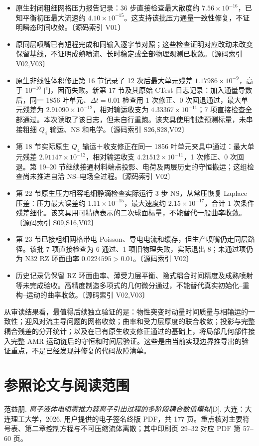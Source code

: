 \documentclass[UTF8,a4paper,11pt,fontset=fandol]{ctexart}
\newcommand{\src}[1]{\textcolor{ink}{\small〔源码索引 #1〕}}
\newcommand{\dt}{\Delta t}
\begin{document}
\begin{itemize}
\item 原生封闭粗细网格压力报告记录：36 步直接检查最大散度约 $7.56\times10^{-16}$，已知平衡初压最大流速约 $4.10\times10^{-15}$。这支持该批压力通量一致性修复，不证明瞬态时间收敛。\src{V01}
\item 原同层喷嘴已有短程完成和同输入逐字节对照；这些检查证明对应改动未改变保留基线，不证明成熟喷流、长时稳定或全部物理观测已收敛。\src{V02,V03}
\item 原生非线性体积修正第 16 节记录了 12 次后最大单元残差 $1.17986\times10^{-9}$，高于 $10^{-10}$ 门，因而失败。新第 17 节及其原始 CTest 日志记录：加入通量导数后，同一 1856 叶单元、$\dt=0.01$ 检查用 1 次修正、0 次回退通过，最大单元残差为 $2.91090\times10^{-12}$，相对输运收支为 $4.33367\times10^{-11}$；7 项直接检查全部通过。本次读取了该日志，但未自行重跑。该夹具使用制造预测标量，未串接粗细 $Q_4$ 输运、NS 和电学。\src{S26,S28,V02}
\item 第 18 节实际原生 $Q_4$ 输运＋收支修正在同一 1856 叶单元夹具中通过：最大单元残差 $2.91147\times10^{-12}$，相对输运收支 $4.21512\times10^{-11}$，1 次修正、0 次回退。第 19--20 节继续接通材料端点投影、电荷及两层历史的守恒搬运；这组检查尚未推进自洽 NS--电场全过程。\src{V02}
\item 第 22 节原生压力相容毛细静滴检查实际运行 3 步 NS，从常压恢复 Laplace 压差：压力最大误差约 $1.11\times10^{-15}$，最大速度约 $2.15\times10^{-17}$，合计 1 次条件残差细化。该夹具用可精确表示的二次球面标量，不能替代一般曲率收敛。\src{S09,S16,V02}
\item 第 23 节已接粗细网格带电 Poisson、导电电流和缓存，但生产喷嘴仍走同层路径。该批 7 项直接检查为 6 通过、1 项旧物理失败，实际退出 8；未通过项仍为 N32 RZ 环面曲率 $0.0224595>0.01$。\src{V02}
\item 历史记录仍保留 RZ 环面曲率、薄受力层平衡、隐式耦合时间精度及成熟喷射等未完成验收。高精度制造多项式的几何微分通过，不能替代真实初始化--重构--运动的曲率收敛。\src{V02,V03}
\end{itemize}

从审读结果看，最值得后续独立验证的是：物性突变时动量时间质量与相输运的一致性；迎风对流主导问题的网格收敛；曲率和受力层厚度的联合收敛；投影与完整耦合残差的分开统计；以及在已有原生收支修正通过的基础上，将局部几何部件接入完整 AMR 运动链后的守恒和时间层验证。这些是由当前实现边界推导出的验证重点，不是已经发现并修复的代码故障清单。

\appendix
\section{参照论文与阅读范围}
范益朋. \emph{离子液体电喷雾推力器离子引出过程的多阶段耦合数值模拟}[D]. 大连：大连理工大学，2026. 用户提供的电子签名终版 PDF，共 177 页。重点核对主要符号表、第二章控制方程与不可压缩流体离散；其中印刷页 29--32 对应 PDF 第 57--60 页。
\end{document}
